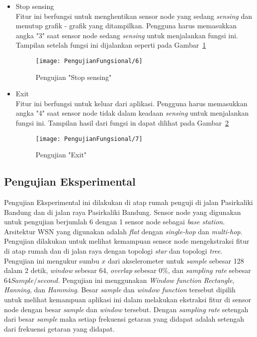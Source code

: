 \begin{itemize}
\item Stop sensing \\
Fitur ini berfungsi untuk menghentikan sensor node yang sedang {\it sensing} dan menutup grafik - grafik yang ditampilkan. Pengguna harus memasukkan angka "3" saat sensor node sedang {\it sensing} untuk menjalankan fungsi ini. Tampilan setelah fungsi ini dijalankan seperti pada Gambar~\ref{fig:PengujianFungsional6}
\begin{figure}[H]
	\centering
	\texttt{[image: PengujianFungsional/6]}  
	\caption[Pengujian "Stop sensing" ]{Pengujian "Stop sensing"} 
	\label{fig:PengujianFungsional6} 
\end{figure}

\item Exit \\
Fitur ini berfungsi untuk keluar dari aplikasi. Pengguna harus memasukkan angka "4" saat sensor node tidak dalam keadaan {\it sensing} untuk menjalankan fungsi ini. Tampilan 
hasil dari fungsi in dapat dilihat pada Gambar~\ref{fig:PengujianFungsional7}
\begin{figure}[H]
	\centering
	\texttt{[image: PengujianFungsional/7]}  
	\caption[Pengujian "Exit" ]{Pengujian "Exit"} 
	\label{fig:PengujianFungsional7} 
\end{figure}

\end{itemize}
\subsection{Pengujian Eksperimental}
Pengujian Eksperimental ini dilakukan di atap rumah penguji di jalan Pasirkaliki Bandung dan di jalan raya Pasirkaliki Bandung. Sensor node yang digunakan untuk pengujian berjumlah 6 dengan 1 sensor node sebagai {\it base station}. Arsitektur WSN yang digunakan adalah {\it flat} dengan {\it single-hop} dan {\it multi-hop}. Pengujian dilakukan untuk melihat kemampuan sensor node mengekstraksi fitur di atap rumah dan di jalan raya dengan topologi {\it star} dan topologi {\it tree}. Pengujian ini mengukur sumbu $x$ dari akselerometer untuk {\it sample} sebesar 128 dalam 2 detik, {\it window} sebesar 64, {\it overlap} sebesar 0\%, dan {\it sampling rate} sebesar $64 Sample/second$. 
Pengujian ini menggunakan {\it Window function} {\it Rectangle}, {\it Hanning}, dan {\it Hamming}. Besar {\it sample} dan {\it window function} tersebut dipilih untuk melihat kemampuan aplikasi ini dalam melakukan ekstraksi fitur di sensor node  dengan besar {\it sample} dan {\it window} tersebut. Dengan {\it sampling rate} setengah dari besar {\it sample} maka setiap frekuensi getaran yang didapat adalah setengah dari frekuensi getaran yang didapat. 

